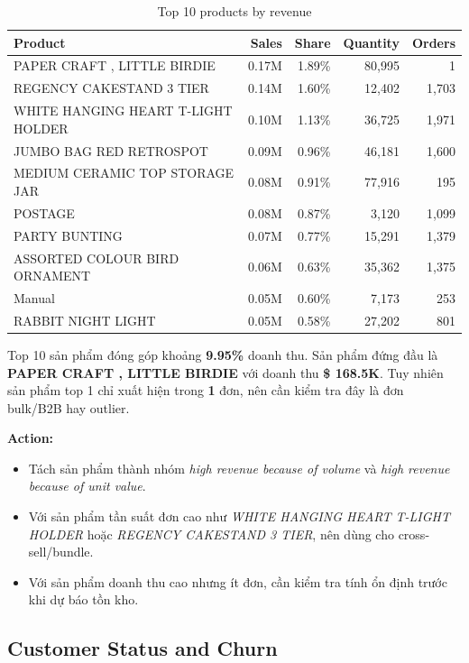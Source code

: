 \documentclass[11pt,a4paper]{article}
\begin{document}
\begin{table}[H]
\centering
\caption{Top 10 products by revenue}
\begin{tabular}{p{5.3cm}rrrr}
\toprule
\textbf{Product} & \textbf{Sales} & \textbf{Share} & \textbf{Quantity} & \textbf{Orders} \\
\midrule
PAPER CRAFT , LITTLE BIRDIE & 0.17M & 1.89\% & 80,995 & 1 \\
REGENCY CAKESTAND 3 TIER & 0.14M & 1.60\% & 12,402 & 1,703 \\
WHITE HANGING HEART T-LIGHT HOLDER & 0.10M & 1.13\% & 36,725 & 1,971 \\
JUMBO BAG RED RETROSPOT & 0.09M & 0.96\% & 46,181 & 1,600 \\
MEDIUM CERAMIC TOP STORAGE JAR & 0.08M & 0.91\% & 77,916 & 195 \\
POSTAGE & 0.08M & 0.87\% & 3,120 & 1,099 \\
PARTY BUNTING & 0.07M & 0.77\% & 15,291 & 1,379 \\
ASSORTED COLOUR BIRD ORNAMENT & 0.06M & 0.63\% & 35,362 & 1,375 \\
Manual & 0.05M & 0.60\% & 7,173 & 253 \\
RABBIT NIGHT LIGHT & 0.05M & 0.58\% & 27,202 & 801 \\
\bottomrule
\end{tabular}
\end{table}

Top 10 sản phẩm đóng góp khoảng \textbf{9.95\%} doanh thu. Sản phẩm đứng đầu là \textbf{PAPER CRAFT , LITTLE BIRDIE} với doanh thu \textbf{\$ 168.5K}. Tuy nhiên sản phẩm top 1 chỉ xuất hiện trong \textbf{1} đơn, nên cần kiểm tra đây là đơn bulk/B2B hay outlier.

\textbf{Action:}
\begin{itemize}
    \item Tách sản phẩm thành nhóm \textit{high revenue because of volume} và \textit{high revenue because of unit value}.
    \item Với sản phẩm tần suất đơn cao như \textit{WHITE HANGING HEART T-LIGHT HOLDER} hoặc \textit{REGENCY CAKESTAND 3 TIER}, nên dùng cho cross-sell/bundle.
    \item Với sản phẩm doanh thu cao nhưng ít đơn, cần kiểm tra tính ổn định trước khi dự báo tồn kho.
\end{itemize}

\subsection{Customer Status and Churn}
\end{document}
